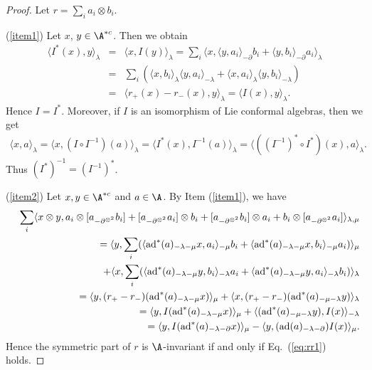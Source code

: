 \documentclass[12pt]{amsart}
\begin{document}
\begin{proof}
Let $r=\sum_i a_i \otimes b_i$.

(\ref{item1})
   Let $x$, $y\in \A^{*c}$. Then we obtain
    \begin{eqnarray*}
        \langle I^*(x),y\rangle_\lambda&=&\langle x,I(y)\rangle_\lambda=\sum_i\langle x,\langle y,a_i\rangle_{-\partial}b_i+\langle y,b_i\rangle_{-\partial}a_i\rangle_\lambda\\
        &=&\sum_i(\langle x,b_i\rangle_\lambda\langle y,a_i\rangle_{-\lambda}+\langle x,a_i\rangle_\lambda\langle y,b_i\rangle_{-\lambda})\\
        &=&\langle r_+(x)-r_-(x),y\rangle_\lambda=\langle
        I(x),y\rangle_\lambda.
    \end{eqnarray*}
    Hence $I=I^*$. Moreover, if $I$ is an isomorphism of Lie conformal algebras, then we get
    \begin{eqnarray*}
        \langle x,a \rangle_\lambda =\langle x,(I\circ I^{-1}) (a)\rangle_\lambda =\langle I^*(x),I^{-1}(a ) \rangle_\lambda=\langle ((I^{-1})^*\circ I^*)(x),a\rangle_\lambda.
    \end{eqnarray*}
 Thus $({I^\ast})^{-1}=(I^{-1})^*$. %

 (\ref{item2})   Let $x,y\in \A^{*c}$ and $a\in \A$.  By Item (\ref{item1}), we have
    \begin{eqnarray*}
        &&\sum_i   \langle x\otimes y, a_i\otimes [a_{-\partial^{\otimes^2}}b_i]+ [a_{-\partial^{\otimes^2}}a_i]\otimes  b_i  + [a_{-\partial^{\otimes^2}}b_i]\otimes a_i+ b_i \otimes [a_{-\partial^{\otimes^2}}a_i]  \rangle_{ \lambda,\mu}\\
        &&\quad=        \langle y, \sum_i ( \langle {\rm ad}^*(a)_{-\lambda-\mu}x, a_i\rangle_{-\mu}b_i +\langle {\rm ad}^*(a)_{-\lambda-\mu}x, b_i\rangle_{-\mu}a_i )  \rangle_\mu  \\
        &&\quad\quad+\langle x, \sum_i ( \langle {\rm ad}^*(a)_{-\lambda-\mu}y, b_i\rangle_{-\lambda}a_i +\langle {\rm ad}^*(a)_{-\lambda-\mu}y, a_i\rangle_{-\lambda}b_i)  \rangle_\lambda   \\
        &&\quad=\langle y, (r_+-r_-)({\rm ad}^*(a)_{-\lambda-\mu}x )\rangle_\mu
        +\langle x, (r_+-r_-)({\rm ad}^*(a)_{-\mu-\lambda}y )\rangle_\lambda\\
        &&\quad=\langle y, I ({\rm ad}^*(a)_{-\lambda-\mu}x )\rangle_\mu
        +\langle   ({\rm ad}^*(a)_{-\mu-\lambda}y ),I(x)  \rangle_{-\lambda}\\
        &&\quad=\langle y, I ({\rm ad}^*(a)_{-\lambda-\partial}x )\rangle_\mu
        - \langle   y ,({\rm ad}(a)_{-\lambda-\partial})I(x)
        \rangle_{\mu}.
    \end{eqnarray*}
    Hence the symmetric part of $r$ is $\A$-invariant if and only
    if Eq.~(\ref{eq:rr1}) holds.
\end{proof}
\end{document}
